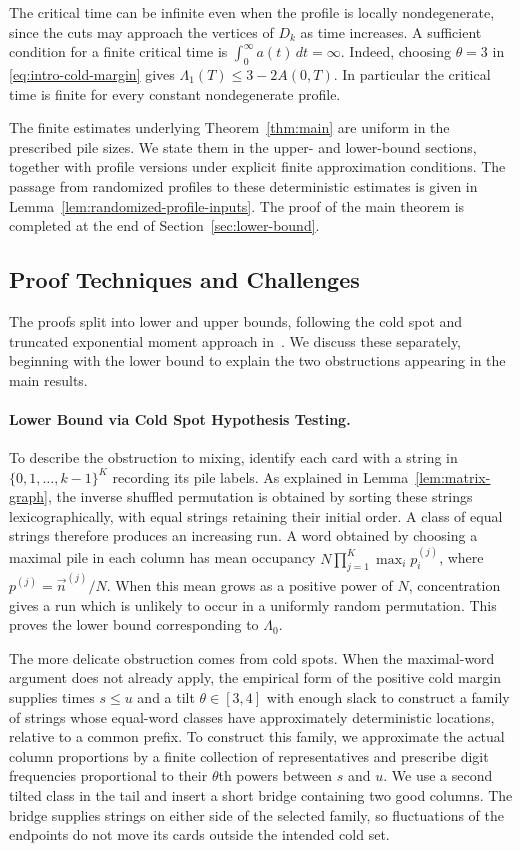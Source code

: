 \documentclass[11pt]{article}
\numberwithin{equation}{section}
\theoremstyle{definition}
\theoremstyle{remark}
\newcommand{\1}{\mathbf 1}
\begin{document}
The critical time can be infinite even when the profile is locally
nondegenerate, since the cuts may approach the vertices of $D_k$ as time
increases. A sufficient condition for a finite critical time is
$\int_0^\infty a(t)\,dt=\infty$. Indeed, choosing $\theta=3$ in
\eqref{eq:intro-cold-margin} gives
$\Lambda_1(T)\le3-2A(0,T)$. In particular the critical time is finite
for every constant nondegenerate profile.

The finite estimates underlying Theorem~\ref{thm:main} are uniform in
the prescribed pile sizes. We state them in the upper- and lower-bound
sections, together with profile versions under explicit finite
approximation conditions. The passage from randomized profiles to
these deterministic estimates is given in
Lemma~\ref{lem:randomized-profile-inputs}. The proof of the main theorem
is completed at the end of Section~\ref{sec:lower-bound}.


\subsection{Proof Techniques and Challenges}

The proofs split into lower and upper bounds, following the cold spot
and truncated exponential moment approach in~\cite{SSW}. We discuss
these separately, beginning with the lower bound to explain the two
obstructions appearing in the main results.

\paragraph{Lower Bound via Cold Spot Hypothesis Testing.}
To describe the obstruction to mixing, identify each card with a string
in $\{0,1,\ldots,k-1\}^K$ recording its pile labels. As explained in
Lemma~\ref{lem:matrix-graph}, the inverse shuffled permutation is obtained
by sorting these strings lexicographically, with equal strings retaining
their initial order. A class of equal strings therefore produces an
increasing run. A word obtained by choosing a maximal pile in each column
has mean occupancy $N\prod_{j=1}^K\max_i p_i^{(j)}$, where
$p^{(j)}=\vec n^{(j)}/N$. When this mean grows as a positive power
of $N$, concentration
gives a run which is unlikely to occur in a uniformly random permutation.
This proves the lower bound corresponding to $\Lambda_0$.

The more delicate obstruction comes from cold spots. When the maximal-word
argument does not already apply, the empirical form of the positive
cold margin supplies times $s\le u$ and a tilt
$\theta\in[3,4]$ with enough slack to construct a family of strings
whose equal-word classes have approximately deterministic locations,
relative to a common prefix. To construct this family, we approximate
the actual column proportions by a finite collection of representatives
and prescribe digit frequencies proportional to their $\theta$th powers
between $s$ and $u$. We use a second tilted class in the tail and insert
a short bridge containing two good columns. The bridge supplies strings
on either side of the selected family, so fluctuations of the endpoints
do not move its cards outside the intended cold set.
\end{document}
